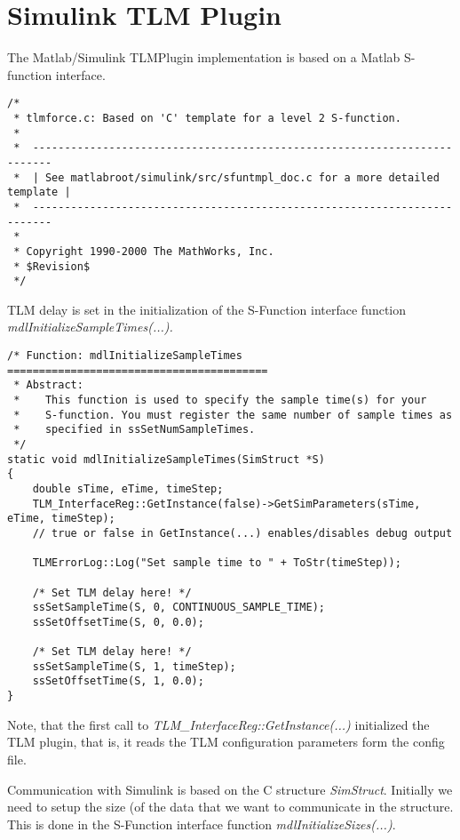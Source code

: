 \chapter{Simulink TLM Plugin}

The Matlab/Simulink TLMPlugin implementation is based on a Matlab
S-function interface.

{\scriptsize
\begin{verbatim}
/*
 * tlmforce.c: Based on 'C' template for a level 2 S-function.
 *
 *  -------------------------------------------------------------------------
 *  | See matlabroot/simulink/src/sfuntmpl_doc.c for a more detailed template |
 *  -------------------------------------------------------------------------
 *
 * Copyright 1990-2000 The MathWorks, Inc.
 * $Revision$
 */
\end{verbatim}
}

TLM delay is set in the initialization of the S-Function interface
function {\em mdlInitializeSampleTimes(...).}

{\scriptsize
\begin{verbatim}
/* Function: mdlInitializeSampleTimes =========================================
 * Abstract:
 *    This function is used to specify the sample time(s) for your
 *    S-function. You must register the same number of sample times as
 *    specified in ssSetNumSampleTimes.
 */
static void mdlInitializeSampleTimes(SimStruct *S)
{
    double sTime, eTime, timeStep;
    TLM_InterfaceReg::GetInstance(false)->GetSimParameters(sTime, eTime, timeStep);
    // true or false in GetInstance(...) enables/disables debug output

    TLMErrorLog::Log("Set sample time to " + ToStr(timeStep));

    /* Set TLM delay here! */
    ssSetSampleTime(S, 0, CONTINUOUS_SAMPLE_TIME);
    ssSetOffsetTime(S, 0, 0.0);

    /* Set TLM delay here! */
    ssSetSampleTime(S, 1, timeStep);
    ssSetOffsetTime(S, 1, 0.0);
}
\end{verbatim}
}

Note, that the first call to {\em TLM\_InterfaceReg::GetInstance(...)}
initialized the TLM plugin, that is, it reads the TLM configuration
parameters form the config file.

Communication with Simulink is based on the C structure {\em
  SimStruct}. Initially we need to setup the size (of the
data that we want to communicate in the structure. This is done in the
S-Function interface function {\em mdlInitializeSizes(...)}.

